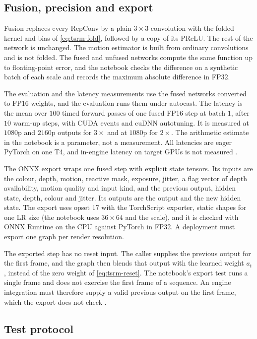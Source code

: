 \subsection{Fusion, precision and export}\label{sec:tsrm-deploy}

Fusion replaces every RepConv by a plain $3\times3$ convolution with the folded kernel and bias of \cref{eq:tsrm-fold}, followed by a copy of its PReLU. The rest of the network is unchanged. The motion estimator is built from ordinary convolutions and is not folded. The fused and unfused networks compute the same function up to floating-point error, and the notebook checks the difference on a synthetic batch of each scale and records the maximum absolute difference in FP32.

The evaluation and the latency measurements use the fused networks converted to FP16 weights, and the evaluation runs them under autocast. The latency is the mean over $100$ timed forward passes of one fused FP16 step at batch $1$, after $10$ warm-up steps, with CUDA events and cuDNN autotuning. It is measured at $1080$p and $2160$p outputs for $3\times$ and at $1080$p for $2\times$. The arithmetic estimate in the notebook is a parameter, not a measurement. All latencies are eager PyTorch on one T4, and in-engine latency on target GPUs is not measured \UnderRevision.

The ONNX export wraps one fused step with explicit state tensors. Its inputs are the colour, depth, motion, reactive mask, exposure, jitter, a flag vector of depth availability, motion quality and input kind, and the previous output, hidden state, depth, colour and jitter. Its outputs are the output and the new hidden state. The export uses opset $17$ with the TorchScript exporter, static shapes for one LR size (the notebook uses $36\times64$ and the scale), and it is checked with ONNX Runtime on the CPU against PyTorch in FP32. A deployment must export one graph per render resolution.

The exported step has no reset input. The caller supplies the previous output for the first frame, and the graph then blends that output with the learned weight $a_t$, instead of the zero weight of \cref{eq:tsrm-reset}. The notebook's export test runs a single frame and does not exercise the first frame of a sequence. An engine integration must therefore supply a valid previous output on the first frame, which the export does not check \UnderRevision.

\subsection{Test protocol}\label{sec:tsrm-test}

